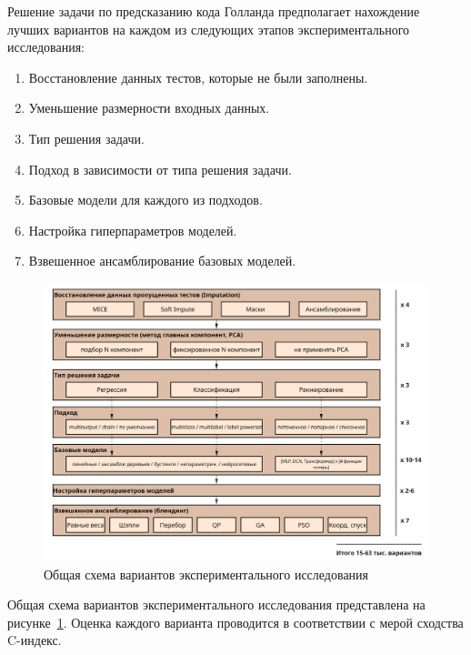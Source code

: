 Решение задачи по предсказанию кода Голланда предполагает нахождение лучших вариантов на каждом из следующих этапов экспериментального исследования:
\begin{enumerate}[noitemsep, topsep=2pt, parsep=0pt, partopsep=0pt]
    \item Восстановление данных тестов, которые не были заполнены.
    \item Уменьшение размерности входных данных.
    \item Тип решения задачи.
    \item Подход в зависимости от типа решения задачи.
    \item Базовые модели для каждого из подходов.
    \item Настройка гиперпараметров моделей.
    \item Взвешенное ансамблирование базовых моделей.
\end{enumerate}

\begin{figure}[htb]
    \centering
    \includegraphics[width=1\linewidth]{figures/multi_pipeline.jpg}
    \caption{Общая схема вариантов экспериментального исследования}
    \label{fig:multi_pipeline}
\end{figure}

Общая схема вариантов экспериментального исследования представлена на  рисунке~\ref{fig:multi_pipeline}. Оценка каждого варианта проводится в соответствии с мерой сходства C-индекс. 

